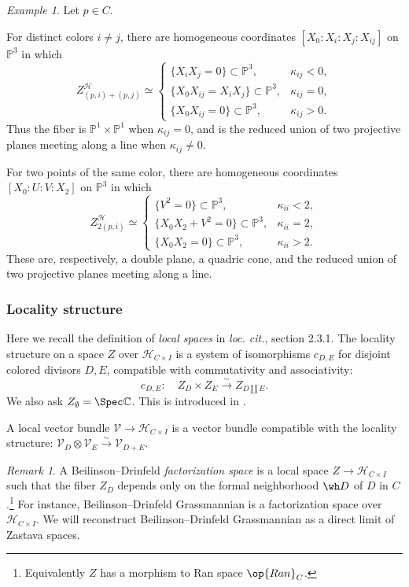 \documentclass{amsart}
\numberwithin{equation}{section}
\numberwithin{figure}{section}
\theoremstyle{definition}
\theoremstyle{remark}
\newtheorem{rmk}[thm]{Remark}
\newtheorem{ex}[thm]{Example}
\renewcommand{\c}[1]{\mathcal{#1}}
\renewcommand{\b}[1]{\mathbb{#1}}
\begin{document}
\begin{ex}
	\label{ex:zastava-two-point-fibers}
	Let $p\in C$.
	
	For distinct colors $i\ne j$, there are homogeneous coordinates
	$[X_0:X_i:X_j:X_{ij}]$ on $\b P^3$ in which
	\[
	Z^{\c H}_{(p,i)+(p,j)}\simeq
	\begin{cases}
		\{X_iX_j=0\}\subset\b P^3,&\kappa_{ij}<0,\\
		\{X_0X_{ij}=X_iX_j\}\subset\b P^3,&\kappa_{ij}=0,\\
		\{X_0X_{ij}=0\}\subset\b P^3,&\kappa_{ij}>0.
	\end{cases}
	\]
	Thus the fiber is $\b P^1\times\b P^1$ when $\kappa_{ij}=0$,
	and is the reduced union of two projective planes meeting along
	a line when $\kappa_{ij}\ne0$.
	
	For two points of the same color, there are homogeneous coordinates
	$[X_0:U:V:X_2]$ on $\b P^3$ in which
	\[
	Z^{\c H}_{2(p,i)}\simeq
	\begin{cases}
		\{V^2=0\}\subset\b P^3,&\kappa_{ii}<2,\\
		\{X_0X_2+V^2=0\}\subset\b P^3,&\kappa_{ii}=2,\\
		\{X_0X_2=0\}\subset\b P^3,&\kappa_{ii}>2.
	\end{cases}
	\]
	These are, respectively, a double plane, a quadric cone, and
	the reduced union of two projective planes meeting along a line.
\end{ex}

\subsubsection{Locality structure}\label{local}
Here we recall the definition of \textit{local spaces} in \textit{loc. cit.}, section 2.3.1. The locality structure on a space $Z$ over $\c H_{C\times I}$ is a system of isomorphisms $c_{D,E}$ for disjoint colored divisors $D,E$, compatible with commutativity and associativity:
$$c_{D,E}:\quad Z_{D}\times Z_E\xrightarrow{\sim} Z_{D\coprod E}.$$
We also ask $Z_\emptyset=\Spec\b C$. This is introduced in \cite{mirkovic2021loop}.

A local vector bundle $\c V\to \c H_{C\times I}$ is a vector bundle compatible with the locality structure: $\c V_D \otimes \c V_E\xrightarrow{\sim} \c V_{D+E}$.
\begin{rmk}
A Beilinson--Drinfeld \textit{factorization space} is a local space $Z\to \c H_{C\times I}$
such that the fiber $Z_D$ depends only on the formal neighborhood $\wh D$ of $D$ in $C$.\footnote{Equivalently $Z$ has a morphism to Ran space $\op{Ran}_C$.} For instance, Beilinson--Drinfeld Grassmannian is a factorization space over $\c H_{C\times I}$. We will reconstruct Beilinson--Drinfeld Grassmannian as a direct limit of Zastava spaces. 
\end{rmk}
\end{document}
